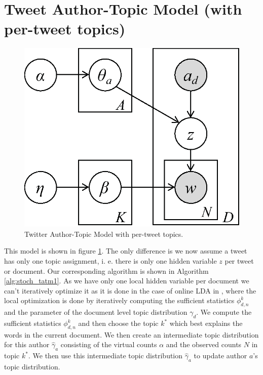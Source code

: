 \section{Tweet Author-Topic Model (with per-tweet topics)}
\begin{figure}[h]
\centering
\includegraphics[width=0.4\linewidth]{TATM1}
\caption{Twitter Author-Topic Model with per-tweet topics.}
\label{fig:TATM1}
\end{figure}
This model is shown in figure \ref{fig:TATM1}. The only difference is we now assume a tweet has only one topic assignment, i. e. there is only one hidden variable $z$ per tweet or document. Our corresponding algorithm is shown in Algorithm \ref{alg:stoch_tatm1}. As we have only one local hidden variable per document we can't iteratively optimize it as it is done in the case of online LDA in \cite{Hoffman12}, where the local optimization is done by iteratively computing the sufficient statistics $\phi^k_{d,n}$ and the parameter of the document level topic distribution $\gamma_d$. We compute the sufficient statistics $\phi_{d,n}^k$ and then choose the topic $k^*$ which best explains the words in the current document. We then create an intermediate topic distribution for this author $\hat\gamma_a$ consisting of the virtual counts $\alpha$ and the observed counts $N$ in topic $k^*$. We then use this intermediate topic distribution $\hat\gamma_a$ to update author $a$'s topic distribution.